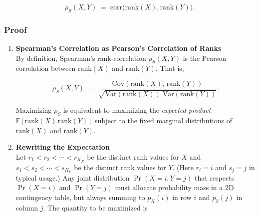 \documentclass[
  12pt,
  letterpaper,
  DIV=11,
  numbers=noendperiod]{scrartcl}
\begin{document}
\[\rho_S(X, Y) \;=\; \mathrm{corr}\bigl(\mathrm{rank}(X), \mathrm{rank}(Y)\bigr).\]

\subsubsection{\texorpdfstring{\textbf{Proof}}{Proof}}\label{proof}

\begin{enumerate}
\def\labelenumi{\arabic{enumi}.}
\item
  \textbf{Spearman's Correlation as Pearson's Correlation of Ranks}\\
  By definition, Spearman's rank-correlation \(\rho_S(X,Y)\) is the
  Pearson correlation between \(\mathrm{rank}(X)\) and
  \(\mathrm{rank}(Y)\). That is,

  \[\rho_S(X, Y) \;=\; \frac{\mathrm{Cov}(\mathrm{rank}(X),\, \mathrm{rank}(Y))}{\sqrt{\mathrm{Var}(\mathrm{rank}(X))\;\mathrm{Var}(\mathrm{rank}(Y))}}.\]

  Maximizing \(\rho_S\) is equivalent to maximizing the \emph{expected
  product} \(\mathbb{E}[\mathrm{rank}(X)\,\mathrm{rank}(Y)]\) subject to
  the fixed marginal distributions of \(\mathrm{rank}(X)\) and
  \(\mathrm{rank}(Y)\).
\item
  \textbf{Rewriting the Expectation}\\
  Let \(r_1 < r_2 < \cdots < r_{K_X}\) be the distinct rank values for
  \(X\) and \(s_1 < s_2 < \cdots < s_{K_Y}\) be the distinct rank values
  for \(Y\). (Here \(r_i = i\) and \(s_j = j\) in typical usage.) Any
  joint distribution \(\Pr(X=i, Y=j)\) that respects \(\Pr(X=i)\) and
  \(\Pr(Y=j)\) must allocate probability mass in a 2D contingency table,
  but always summing to \(p_X(i)\) in row \(i\) and \(p_Y(j)\) in column
  \(j\). The quantity to be maximized is


\end{enumerate}
\end{document}
